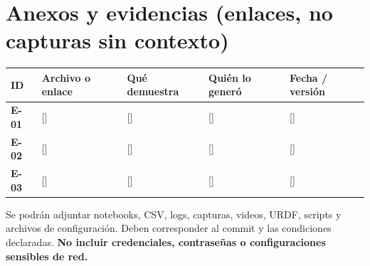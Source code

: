 \documentclass[10pt, a4paper]{article}
\newcommand{\campo}[1]{{\ttfamily\small[#1]}}
\begin{document}
\newpage
\section*{Anexos y evidencias {\small\normalfont(enlaces, no capturas sin contexto)}}

\begingroup
\footnotesize
\setlength{\tabcolsep}{4pt}
\renewcommand{\arraystretch}{1.45}
\noindent\begin{tabularx}{\textwidth}{|l|>{\hsize=1.05\hsize\raggedright\arraybackslash}X|>{\hsize=1.25\hsize\raggedright\arraybackslash}X|>{\hsize=0.85\hsize\raggedright\arraybackslash}X|>{\hsize=0.85\hsize\raggedright\arraybackslash}X|}
\hline
\rowcolor{ucbblue!15}
\textbf{ID} & \textbf{Archivo o enlace} & \textbf{Qué demuestra} & \textbf{Quién lo generó} & \textbf{Fecha / versión} \\ \hline
\textbf{E-01} & \campo{\quad} & \campo{\quad} & \campo{\quad} & \campo{\quad} \\ \hline
\textbf{E-02} & \campo{\quad} & \campo{\quad} & \campo{\quad} & \campo{\quad} \\ \hline
\textbf{E-03} & \campo{\quad} & \campo{\quad} & \campo{\quad} & \campo{\quad} \\ \hline
\end{tabularx}
\endgroup

\vspace{4pt}
{\footnotesize Se podrán adjuntar notebooks, CSV, logs, capturas, videos, URDF, scripts y archivos de configuración. Deben corresponder al commit y las condiciones declaradas. \textbf{No incluir credenciales, contraseñas o configuraciones sensibles de red.}}
\end{document}
